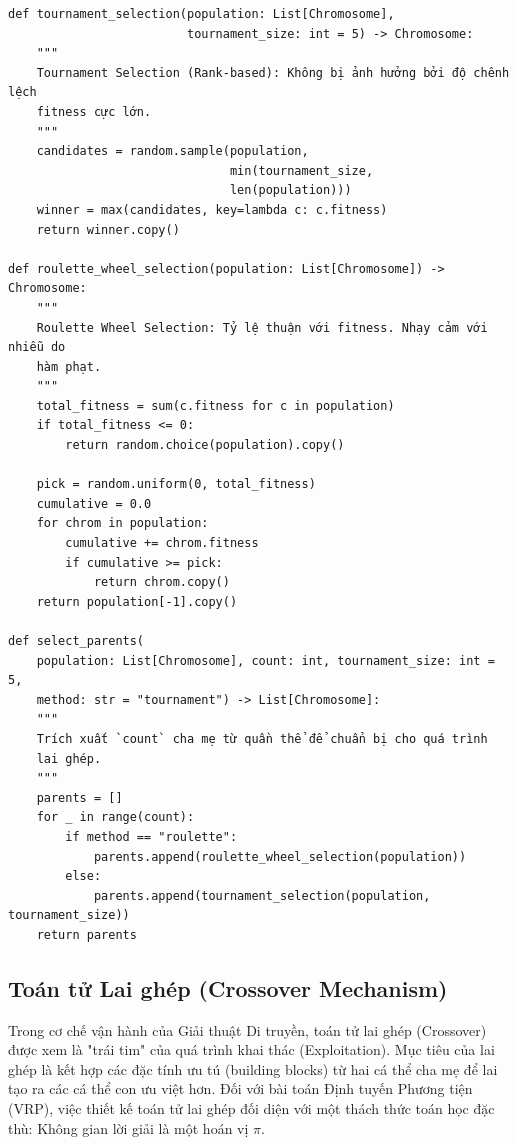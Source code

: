 \documentclass[12pt,a4paper]{article}
\numberwithin{figure}{subsection}
\numberwithin{table}{subsection}
\newcounter{codecounter}
\newenvironment{codeblock}[2]{%
    \refstepcounter{codecounter}%
    \phantomsection%
    \label{#1}%
    \par\smallskip
}{%
    \par\smallskip
}
\begin{document}
\begin{codeblock}{app:code:selection}{Chọn lọc cha mẹ}
\begin{verbatim}
def tournament_selection(population: List[Chromosome], 
                         tournament_size: int = 5) -> Chromosome:
    """
    Tournament Selection (Rank-based): Không bị ảnh hưởng bởi độ chênh lệch 
    fitness cực lớn.
    """
    candidates = random.sample(population, 
                               min(tournament_size, 
                               len(population)))
    winner = max(candidates, key=lambda c: c.fitness)
    return winner.copy()

def roulette_wheel_selection(population: List[Chromosome]) -> Chromosome:
    """
    Roulette Wheel Selection: Tỷ lệ thuận với fitness. Nhạy cảm với nhiễu do 
    hàm phạt.
    """
    total_fitness = sum(c.fitness for c in population)
    if total_fitness <= 0:
        return random.choice(population).copy()

    pick = random.uniform(0, total_fitness)
    cumulative = 0.0
    for chrom in population:
        cumulative += chrom.fitness
        if cumulative >= pick:
            return chrom.copy()
    return population[-1].copy()

def select_parents(
    population: List[Chromosome], count: int, tournament_size: int = 5, 
    method: str = "tournament") -> List[Chromosome]:
    """
    Trích xuất `count` cha mẹ từ quần thể để chuẩn bị cho quá trình 
    lai ghép.
    """
    parents = []
    for _ in range(count):
        if method == "roulette":
            parents.append(roulette_wheel_selection(population))
        else:
            parents.append(tournament_selection(population, tournament_size))
    return parents
\end{verbatim}
\end{codeblock}
\subsection{Toán tử Lai ghép (Crossover Mechanism)}

Trong cơ chế vận hành của Giải thuật Di truyền, toán tử lai ghép (Crossover) được xem là "trái tim" của quá trình khai thác (Exploitation). Mục tiêu của lai ghép là kết hợp các đặc tính ưu tú (building blocks) từ hai cá thể cha mẹ để lai tạo ra các cá thể con ưu việt hơn. Đối với bài toán Định tuyến Phương tiện (VRP), việc thiết kế toán tử lai ghép đối diện với một thách thức toán học đặc thù: Không gian lời giải là một hoán vị $\pi$.
\end{document}
